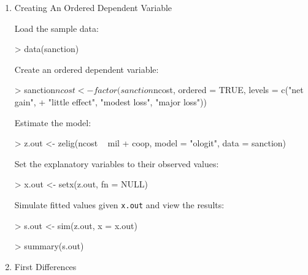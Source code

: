 \begin{enumerate}

\item {Creating An Ordered Dependent Variable} \label{ord.fact}

Load the sample data:  
\begin{Schunk}
\begin{Sinput}
> data(sanction)
\end{Sinput}
\end{Schunk}
Create an ordered dependent variable: 
\begin{Schunk}
\begin{Sinput}
> sanction$ncost <- factor(sanction$ncost, ordered = TRUE, levels = c("net gain", 
+     "little effect", "modest loss", "major loss"))
\end{Sinput}
\end{Schunk}
Estimate the model:
\begin{Schunk}
\begin{Sinput}
> z.out <- zelig(ncost ~ mil + coop, model = "ologit", data = sanction)
\end{Sinput}
\end{Schunk}
Set the explanatory variables to their observed values:  
\begin{Schunk}
\begin{Sinput}
> x.out <- setx(z.out, fn = NULL)
\end{Sinput}
\end{Schunk}
Simulate fitted values given {\tt x.out} and view the results:
\begin{Schunk}
\begin{Sinput}
> s.out <- sim(z.out, x = x.out)
\end{Sinput}
\end{Schunk}
\begin{Schunk}
\begin{Sinput}
> summary(s.out)
\end{Sinput}
\end{Schunk}

\item {First Differences}


\end{enumerate}
